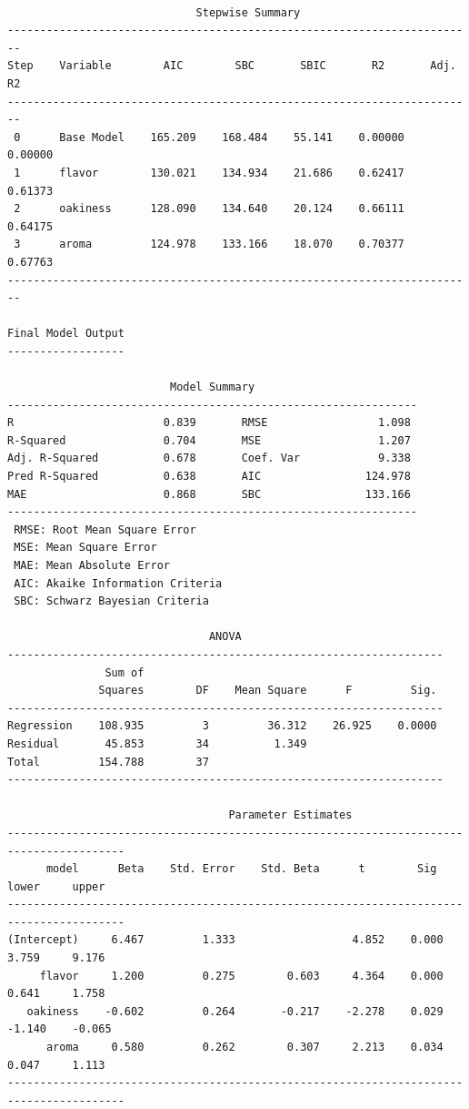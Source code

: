 \documentclass[
  letterpaper,
]{scrbook}
\begin{document}
\begin{verbatim}

                             Stepwise Summary                             
------------------------------------------------------------------------
Step    Variable        AIC        SBC       SBIC       R2       Adj. R2 
------------------------------------------------------------------------
 0      Base Model    165.209    168.484    55.141    0.00000    0.00000 
 1      flavor        130.021    134.934    21.686    0.62417    0.61373 
 2      oakiness      128.090    134.640    20.124    0.66111    0.64175 
 3      aroma         124.978    133.166    18.070    0.70377    0.67763 
------------------------------------------------------------------------

Final Model Output 
------------------

                         Model Summary                          
---------------------------------------------------------------
R                       0.839       RMSE                 1.098 
R-Squared               0.704       MSE                  1.207 
Adj. R-Squared          0.678       Coef. Var            9.338 
Pred R-Squared          0.638       AIC                124.978 
MAE                     0.868       SBC                133.166 
---------------------------------------------------------------
 RMSE: Root Mean Square Error 
 MSE: Mean Square Error 
 MAE: Mean Absolute Error 
 AIC: Akaike Information Criteria 
 SBC: Schwarz Bayesian Criteria 

                               ANOVA                                
-------------------------------------------------------------------
               Sum of                                              
              Squares        DF    Mean Square      F         Sig. 
-------------------------------------------------------------------
Regression    108.935         3         36.312    26.925    0.0000 
Residual       45.853        34          1.349                     
Total         154.788        37                                    
-------------------------------------------------------------------

                                  Parameter Estimates                                    
----------------------------------------------------------------------------------------
      model      Beta    Std. Error    Std. Beta      t        Sig      lower     upper 
----------------------------------------------------------------------------------------
(Intercept)     6.467         1.333                  4.852    0.000     3.759     9.176 
     flavor     1.200         0.275        0.603     4.364    0.000     0.641     1.758 
   oakiness    -0.602         0.264       -0.217    -2.278    0.029    -1.140    -0.065 
      aroma     0.580         0.262        0.307     2.213    0.034     0.047     1.113 
----------------------------------------------------------------------------------------
\end{verbatim}
\end{document}

